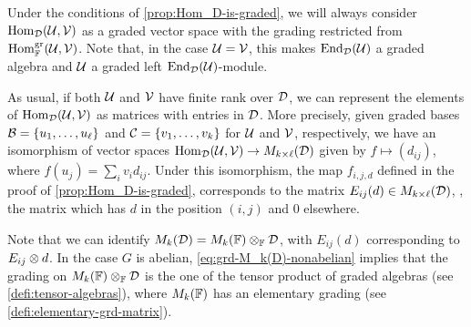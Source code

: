 Under the conditions of \cref{prop:Hom_D-is-graded}, we will always consider $\operatorname{Hom}_{\mathcal{D}} (\mathcal U, \mathcal V)$ as a graded vector space with the grading restricted from $\operatorname{Hom}_{\mathbb{F}}^{\mathrm{gr}} (\mathcal U, \mathcal V)$. 
Note that, in the case $\mathcal U = \mathcal V$, this makes $\operatorname{End}_{\mathcal{D}} (\mathcal U)$ a graded algebra and $\mathcal U$ a graded left $\operatorname{End}_{\mathcal{D}} (\mathcal U)$-module. 


As usual, if both $\mathcal U$ and $\mathcal V$ have finite rank over $\mathcal{D}$, we can represent the elements of $\operatorname{Hom}_{\mathcal{D}}(\mathcal U, \mathcal V)$ as matrices with entries in $\mathcal{D}$. 
More precisely, given graded bases $\mathcal B = \{ u_1, \ldots, u_\ell \}$ and $\mathcal C = \{v_1, \ldots, v_k\}$ for $\mathcal U$ and $\mathcal V$, respectively, we have an isomorphism of vector spaces $\operatorname{Hom}_{\mathcal{D}}(\mathcal U, \mathcal V) \to M_{k\times \ell}(\mathcal{D})$ given by $f\mapsto (d_{ij})$, where $f(u_j) = \sum_i v_i d_{ij}$. 
Under this isomorphism, the map $f_{i, j, d}$ defined in the proof of \cref{prop:Hom_D-is-graded}, corresponds to the matrix $E_{ij}(d) \in M_{k\times \ell}(\mathcal{D})$, \ie, the matrix which has $d$ in the position $(i,j)$ and $0$ elsewhere. 

\begin{remark}\label{rmk:M_k(F)-tensor-D}
    Note that we can identify $M_{k}(\mathcal{D}) = M_{k}(\mathbb{F}) \otimes_{\mathbb{F}} \mathcal{D}$, with $E_{ij}(d)$ corresponding to $E_{ij}\otimes d$. 
    In the case $G$ is abelian, \cref{eq:grd-M_k(D)-nonabelian} implies that the grading on $M_{k}(\mathbb{F}) \otimes_{\mathbb{F}} \mathcal{D}$ is the one of the tensor product of graded algebras (see \cref{defi:tensor-algebras}), where $M_{k}(\mathbb{F})$ has an elementary grading (see \cref{defi:elementary-grd-matrix}).
\end{remark}



